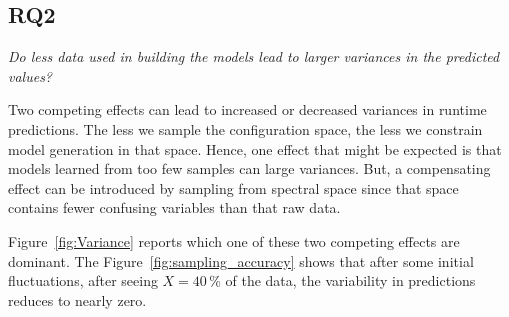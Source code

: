 \documentclass{sig-alternative}
\newcommand{\fig}[1]{Figure~\ref{fig:#1}}
\begin{document}
\subsection{RQ2}

\begin{center}
{\em
Do less data used in building the models lead to larger variances in the predicted values?}
\end{center}


Two competing effects can lead to increased or decreased  variances in 
runtime predictions.
The   less we sample the configuration space,
the less we constrain model generation in that space. Hence, one effect that might be expected
is that models learned
from too few samples can large variances. 
But,
a  compensating effect can be introduced by sampling from spectral space
since that space contains fewer confusing variables than that raw data.

\fig{Variance} reports which one of these two competing effects are dominant. 
The \fig{sampling_accuracy} shows that after some initial fluctuations,
after seeing $X=40$\,\% of the data, the variability in predictions reduces to nearly zero.
\end{document}
